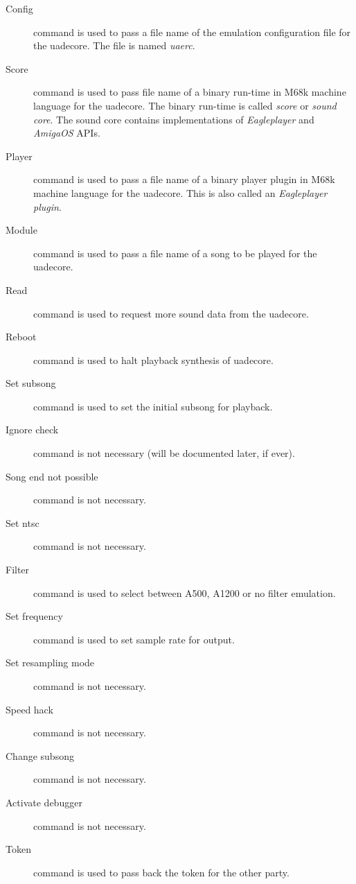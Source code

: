 \documentclass{article}
\begin{document}
\begin{description}
\item [Config] command is used to pass a file name of the emulation
configuration file for the uadecore. The file is named \emph{uaerc}.

\item [Score] command is used to pass file name of a binary run-time in M68k
machine language for the uadecore. The binary run-time is called
\emph{score} or \emph{sound core}. The sound core contains implementations of
\emph{Eagleplayer} and \emph{AmigaOS} APIs.

\item [Player] command is used to pass a file name of a binary player plugin
in M68k machine language for the uadecore. This is also called an
\emph{Eagleplayer plugin}.

\item [Module] command is used to pass a file name of a song to be played
for the uadecore.

\item [Read] command is used to request more sound data from the uadecore.

\item [Reboot] command is used to halt playback synthesis of uadecore.

\item [Set subsong] command is used to set the initial subsong for playback.

\item [Ignore check] command is not necessary (will be documented later,
if ever).
\item [Song end not possible] command is not necessary.
\item [Set ntsc] command is not necessary.
\item [Filter] command is used to select between A500, A1200 or no filter
  emulation.
\item [Set frequency] command is used to set sample rate for output.
\item [Set resampling mode] command is not necessary.
\item [Speed hack] command is not necessary.
\item [Change subsong] command is not necessary.
\item [Activate debugger] command is not necessary.

\item [Token] command is used to pass back the token for the other party.
\end{description}
\end{document}
